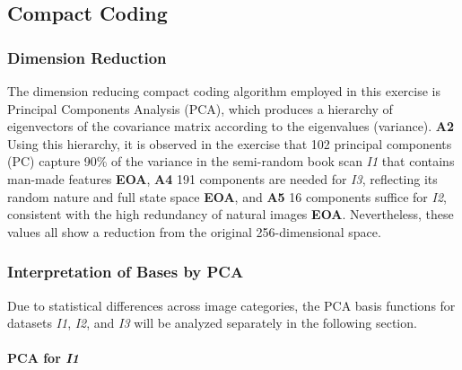 \documentclass[11pt, twocolumn]{article}
\begin{document}
\subsection{Compact Coding}

\vspace{-1em}

\subsubsection{Dimension Reduction}\label{sec:dimreduction}

\vspace{-1em}

The dimension reducing compact coding algorithm employed in this exercise is Principal Components Analysis (PCA), which produces a hierarchy of eigenvectors of the covariance matrix according to the eigenvalues (variance). 
\textbf{A2} Using this hierarchy, it is observed in the exercise that 102 principal components (PC) capture 90\% of the variance in the semi-random book scan \textit{I1} that contains man-made features \cite{field_1994_what} \textbf{EOA}, \textbf{A4} 191 components are needed for \textit{I3}, reflecting its random nature and full state space \textbf{EOA}, and \textbf{A5} 16 components suffice for \textit{I2}, consistent with the high redundancy of natural images \textbf{EOA}. Nevertheless, these values all show a reduction from the original 256-dimensional space.

\subsubsection{Interpretation of Bases by PCA}
Due to statistical differences across image categories, the PCA basis functions for datasets \textit{I1}, \textit{I2}, and \textit{I3} will be analyzed separately in the following section.
\paragraph{PCA for \textit{I1}}
\end{document}
